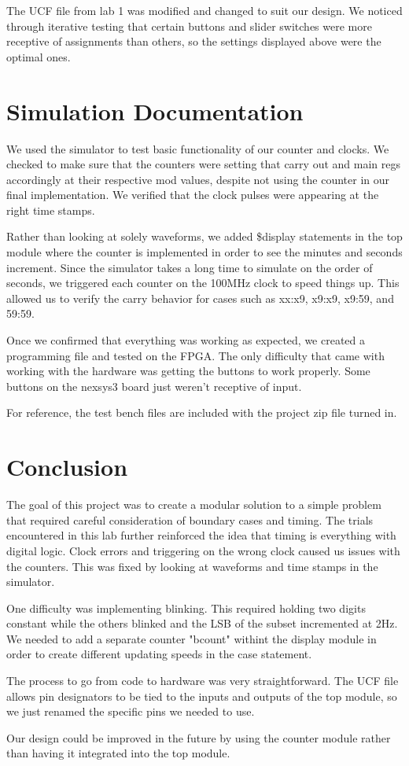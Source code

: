 \documentclass[journal]{IEEEtran}
\begin{document}
The UCF file from lab 1 was modified and changed to suit our design. We noticed through iterative testing that certain buttons and slider switches were more receptive of assignments than others, so the settings displayed above were the optimal ones. 

\section{Simulation Documentation}
We used the simulator to test basic functionality of our counter and clocks. We checked to make sure that the counters were setting that carry out and main regs accordingly at their respective mod values, despite not using the counter in our final implementation. We verified that the clock pulses were appearing at the right time stamps. 
\par
Rather than looking at solely waveforms, we added \$display statements in the top module where the counter is implemented in order to see the minutes and seconds increment. Since the simulator takes a long time to simulate on the order of seconds, we triggered each counter on the 100MHz clock to speed things up. This allowed us to verify the carry behavior for cases such as xx:x9, x9:x9, x9:59, and 59:59.
\par 
Once we confirmed that everything was working as expected, we created a programming file and tested on the FPGA. The only difficulty that came with working with the hardware was getting the buttons to work properly. Some buttons on the nexsys3 board just weren't receptive of input.
\par
For reference, the test bench files are included with the project zip file turned in.

\section{Conclusion}
The goal of this project was to create a modular solution to a simple problem that required careful consideration of boundary cases and timing. The trials encountered in this lab further reinforced the idea that timing is everything with digital logic. Clock errors and triggering on the wrong clock caused us issues with the counters. This was fixed by looking at waveforms and time stamps in the simulator.
\par 
One difficulty was implementing blinking. This required holding two digits constant while the others blinked and the LSB of the subset incremented at 2Hz. We needed to add a separate counter "bcount" withint the display module in order to create different updating speeds in the case statement.  
\par
The process to go from code to hardware was very straightforward. The UCF file allows pin designators to be tied to the inputs and outputs of the top module, so we just renamed the specific pins we needed to use.
\par
Our design could be improved in the future by using the counter module rather than having it integrated into the top module. 
\end{document}
